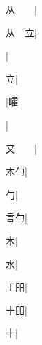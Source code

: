 \begin{multicols}{2}
{{\cjk{}从{\cnsym{}　}{\cnsym{}　}}|{}\par
{\cjk{}从{\cnsym{}　}立}|{}\par
{\cjk{}{\cnsym{}　}{\cnsym{}　}{\cnsym{}　}}|{}\par
{\cjk{}{\cnsym{}　}{\cnsym{}　}立}|{}\par
{\cjk{}{\cnsym{}　}{\cnsym{}　}{\cnsym{}　}}|{\cjk{}曤}\par
{\cjk{}{\cnsym{}　}{\cnsym{}　}{\cnsym{}　}}|{}\par
{\cjk{}又{\cnsym{}　}{\cnsym{}　}}|{}\par
{\cjk{}{\cnsym{}　}木勹}|{}\par
{勹}|{}\par
{\cjk{}{\cnsym{}　}言勹}|{}\par
{\cjk{}{\cnsym{}　}{\cnsym{}　}木}|{}\par
{\cjk{}{\cnsym{}　}{\cnsym{}　}水}|{}\par
{\cjk{}{\cnsym{}　}工昍}|{}\par
{\cjk{}{\cnsym{}　}十昍}|{}\par
{\cjk{}{\cnsym{}　}{\cnsym{}　}十}|{}\par
}
\end{multicols}

